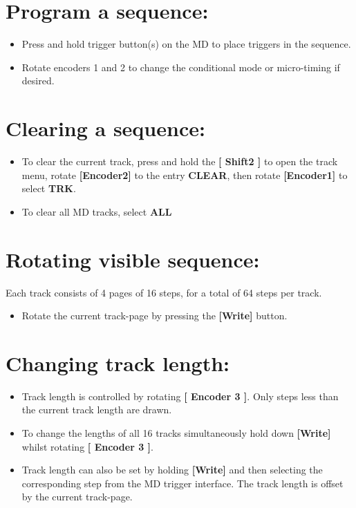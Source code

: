 \vspace{-0.3cm}

\section{Program a sequence:}
\begin{itemize}
\item Press and hold trigger button(s) on the MD to place triggers in the sequence.
\item Rotate encoders 1 and 2 to change the conditional mode or micro-timing if desired.
\end{itemize}

\vspace{-0.3cm}

\section{Clearing a sequence:}
\begin{itemize}
\item To clear the current track, press and hold the\textbf{ [ Shift2 ]} to open the track menu, rotate \textbf{[Encoder2]} to the entry \textbf{CLEAR}, then rotate \textbf{[Encoder1]} to select \textbf{TRK}.
\item To clear all MD tracks, select \textbf{ALL}
\end{itemize}

\vspace{-0.3cm}

\section{Rotating visible sequence:}
Each track consists of 4 pages of 16 steps, for a total of 64 steps per track.
\begin{itemize}
\item Rotate the current track-page by pressing the \textbf{[Write] }button.
\end{itemize}

\vspace{-0.3cm}

\section{Changing track length:}
\begin{itemize}
\item Track length is controlled by rotating \textbf{[ Encoder 3 ]}. Only steps less than the current track length are drawn.
\item To change the lengths of all 16 tracks simultaneously hold down \textbf{[Write]} whilst rotating \textbf{[ Encoder 3 ]}.
\item Track length can also be set by holding \textbf{[Write]} and then selecting the corresponding step from the MD trigger interface. The track length is offset by the current track-page.
\end{itemize}

